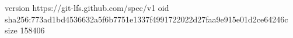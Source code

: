version https://git-lfs.github.com/spec/v1
oid sha256:773ad1bd4536632a5f6b7751e1337f4991722022d27faa9e915e01d2ce64246c
size 158406
